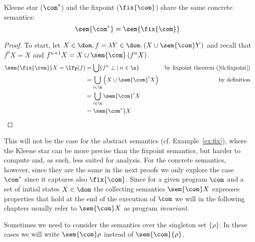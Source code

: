 \begin{proposition}
  Kleene star (\(\com^*\)) and the fixpoint (\(\fix{\com}\)) share the
  same concrete semantics:
  \begin{equation*}
    \sem{\com^*} = \sem{\fix{\com}}
  \end{equation*}
\end{proposition}
\begin{proof}
  To start, let
  \(X \in \dom, f = \lambda Y \in\dom . \left(X \cup
    \sem{\com}Y\right)\) and recall that \(f^0 X = X\) and
  \(f^{n+1} X = X \cup \sem{\com}\left(f^n X\right)\).
  \begin{align*}
    \sem{\fix{\com}}X = \lfp(f) & = \bigcup \{ f^n \; \bot \mid n \in \n \} & \text{by fixpoint theorem (\ref{th:fixpoint})} \\
                                & = \bigcup_{i\in\n} \left( X \cup \sem{\com}^iX \right) & \text{by definition} \\
                                & = \bigcup_{i\in\n} \sem{\com}^i X \\
                                & = \sem{\com^*}X
  \end{align*}
\end{proof}

This will not be the case for the abstract semantics
(cf. Example~\ref{ex:fix}), where the Kleene star can be more precise
than the fixpoint semantics, but harder to compute and, as such, less
suited for analysis. For the concrete semantics, however, since they
are the same in the next proofs we only explore the case \(\com^*\)
since it captures also \(\fix{\com}\). Since for a given program
\(\com\) and a set of initial states \(X \in \dom\) the collecting
semantics \(\sem{\com}X\) expresses properties that hold at the end of
the execution of \(\com\) we will in the following chapters usually
refer to \(\sem{\com}X\) as program \emph{invariant}.

\begin{notation}
  Sometimes we need to consider the semantics over the singleton set
  \(\{\rho\}\). In these cases we will write \(\sem{\com}\rho\)
  instead of \(\sem{\com}\{\rho\}\).
\end{notation}


